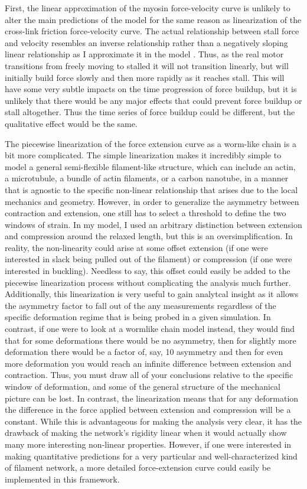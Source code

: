 First, the linear approximation of the myosin force-velocity curve is unlikely to alter the main predictions of the model for the same reason as linearization of the cross-link friction force-velocity curve.  The actual relationship between stall force and velocity resembles an inverse relationship rather than a negatively sloping linear relationship as I approximate it in the model \cite{howard2001mechanics}.  Thus, as the real  motor transitions from freely moving to stalled it will not transition linearly, but will initially build force slowly and then more rapidly as it reaches stall.  This will have some very subtle impacts on the time progression of force buildup, but it is unlikely that there would be any major effects that could prevent force buildup or stall altogether.  Thus the time series of force buildup could be different, but the qualitative effect would be the same.

The piecewise linearization of the force extension curve as a worm-like chain is a bit more complicated.  The simple linearization makes it incredibly simple to model a general semi-flexible filament-like structure, which can include an actin, a microtubule, a bundle of actin filaments, or a carbon nanotube, in a manner that is agnostic to the specific non-linear relationship that arises due to the local mechanics and geometry.  However, in order to generalize the asymmetry between contraction and extension, one still has to select a threshold to define the two windows of strain.  In my model, I used an arbitrary distinction between extension and compression around the relaxed length, but this is an oversimplification.  In reality, the non-linearity could arise at some offset extension (if one were  interested in slack being pulled out of the filament) or compression (if one were interested in buckling).  Needless to say, this offset could easily be added to the piecewise linearization process without complicating the analysis much further.  Additionally, this linearization is very useful to gain analytcal insight as it allows the asymmetry factor to fall out of the any measurements regardless of the specific deformation regime that is being probed in a given simulation.  In contrast, if one were to look at a wormlike chain model instead, they would find that for some deformations there would be no asymmetry, then for slightly more deformation there would be a factor of, say, 10 asymmetry and then for even more deformation you would reach an infinite difference between extension and contraction.  Thus, you must draw all of your conclusions relative to the specific window of deformation, and some of the general structure of the mechanical picture can be lost.  In contrast, the linearization means that for any deformation the difference in the force applied between extension and compression will be a constant.  While this is advantageous for making the analysis very clear, it has the drawback of making the network's rigidity linear when it would actually show many more interesting non-linear properties.  However, if one were interested in making quantitative predictions for a very particular and well-characterized kind of filament network, a more detailed force-extension curve could easily be implemented in this framework.

